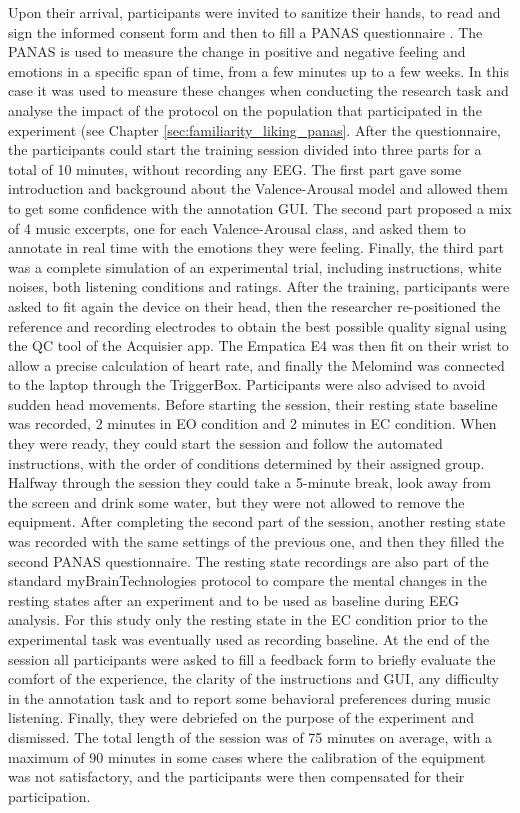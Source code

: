 Upon their arrival, participants were invited to sanitize their hands, to read and sign the informed consent form and then to fill a PANAS questionnaire \cite{watson_development_nodate}. The PANAS is used to measure the change in positive and negative feeling and emotions in a specific span of time, from a few minutes up to a few weeks. In this case it was used to measure these changes when conducting the research task and analyse the impact of the protocol on the population that participated in the experiment (see Chapter \ref{sec:familiarity_liking_panas}. After the questionnaire, the participants could start the training session divided into three parts for a total of 10 minutes, without recording any \ac{EEG}. The first part gave some introduction and background about the Valence-Arousal model and allowed them to get some confidence with the annotation GUI. The second part proposed a mix of 4 music excerpts, one for each Valence-Arousal class, and asked them to annotate in real time with the emotions they were feeling. Finally, the third part was a complete simulation of an experimental trial, including instructions, white noises, both listening conditions and ratings. After the training, participants were asked to fit again the device on their head, then the researcher re-positioned the reference and recording electrodes to obtain the best possible quality signal using the \ac{QC} tool of the Acquisier app. The Empatica E4 was then fit on their wrist to allow a precise calculation of heart rate, and finally the Melomind was connected to the laptop through the TriggerBox. Participants were also advised to avoid sudden head movements. Before starting the session, their resting state baseline was recorded, 2 minutes in \ac{EO} condition and 2 minutes in \ac{EC} condition. When they were ready, they could start the session and follow the automated instructions, with the order of conditions determined by their assigned group. Halfway through the session they could take a 5-minute break, look away from the screen and drink some water, but they were not allowed to remove the equipment. After completing the second part of the session, another resting state was recorded with the same settings of the previous one, and then they filled the second PANAS questionnaire. The resting state recordings are also part of the standard myBrainTechnologies protocol to compare the mental changes in the resting states after an experiment and to be used as baseline during \ac{EEG} analysis. For this study only the resting state in the \ac{EC} condition prior to the experimental task was eventually used as recording baseline. At the end of the session all participants were asked to fill a feedback form to briefly evaluate the comfort of the experience, the clarity of the instructions and GUI, any difficulty in the annotation task and to report some behavioral preferences during music listening. Finally, they were debriefed on the purpose of the experiment and dismissed. The total length of the session was of 75 minutes on average, with a maximum of 90 minutes in some cases where the calibration of the equipment was not satisfactory, and the participants were then compensated for their participation.

